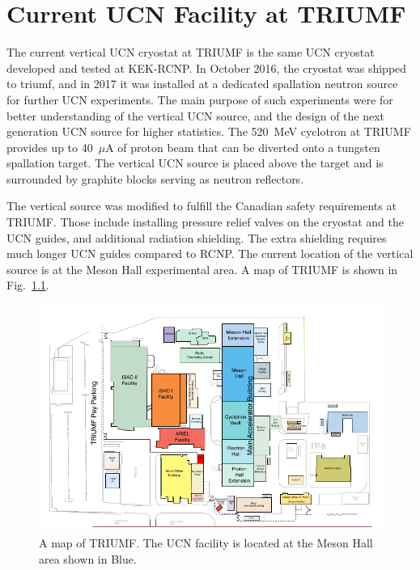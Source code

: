 \chapter{Current UCN Facility at TRIUMF\label{chap:UCNattriumf}}


The current vertical UCN cryostat at TRIUMF is the same UCN cryostat
developed and tested at KEK-RCNP. In October 2016, the cryostat was
shipped to triumf, and in 2017 it was installed at a dedicated
spallation neutron source for further UCN experiments. The main
purpose of such experiments were for better understanding of the
vertical UCN source, and the design of the next generation UCN source
for higher statistics. The 520~MeV cyclotron at TRIUMF provides up to
40~$\mu$A of proton beam that can be diverted onto a tungsten
spallation target. The vertical UCN source is placed above the target
and is surrounded by graphite blocks serving as neutron reflectors.


The vertical source was modified to fulfill the Canadian safety
requirements at TRIUMF. Those include installing pressure relief
valves on the cryostat and the UCN guides, and additional radiation
shielding. The extra shielding requires much longer UCN guides
compared to RCNP. The current location of the vertical source is at
the Meson Hall experimental area. A map of TRIUMF is shown in
Fig.~\ref{fig:sitemap}.

\begin{figure}[h!]
  \centering
  \includegraphics[width=1.0\textwidth]{sitemap.png}
  \caption{A map of TRIUMF. The UCN facility is located at the Meson
    Hall area shown in Blue.}
  \label{fig:sitemap}
\end{figure}

